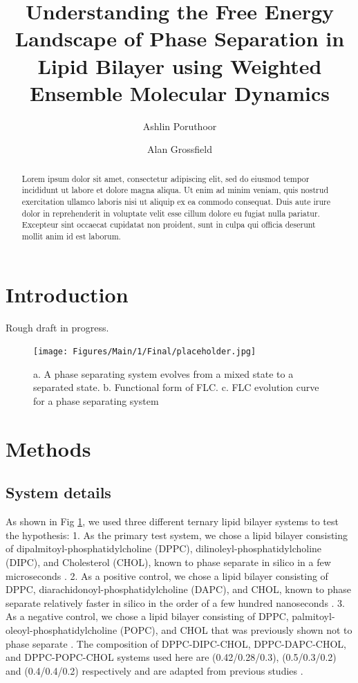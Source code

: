 \documentclass{biophys-new}
\title{Understanding the Free Energy Landscape of Phase Separation in Lipid Bilayer using Weighted Ensemble Molecular Dynamics}
\author[1]{Ashlin Poruthoor}
\author[1,*]{Alan Grossfield}
\affil[1]{University of Rochester Medical Center, Rochester, NY 14620}
\begin{document}
\begin{frontmatter}
\begin{abstract}

Lorem ipsum dolor sit amet, consectetur adipiscing elit, sed do eiusmod tempor incididunt ut labore et dolore magna aliqua. Ut enim ad minim veniam, quis nostrud exercitation ullamco laboris nisi ut aliquip ex ea commodo consequat. Duis aute irure dolor in reprehenderit in voluptate velit esse cillum dolore eu fugiat nulla pariatur. Excepteur sint occaecat cupidatat non proident, sunt in culpa qui officia deserunt mollit anim id est laborum.

\end{abstract}

\end{frontmatter}

\section*{Introduction}

Rough draft in progress.

\begin{figure}[hbt!]
\centering
\texttt{[image: Figures/Main/1/Final/placeholder.jpg]}
\caption{a. A phase separating system evolves from a mixed state to a separated state. b. Functional form of FLC. c. FLC evolution curve for a phase separating system}
\label{fig1:view}
\end{figure}

\section*{Methods}

\subsection*{System details}

As shown in Fig \ref{fig1:view}, we used three different ternary lipid bilayer systems to test the hypothesis:
1. As the primary test system, we chose a lipid bilayer consisting of dipalmitoyl-phosphatidylcholine (DPPC), dilinoleyl-phosphatidylcholine (DIPC), and Cholesterol (CHOL), known to phase separate in silico in a few microseconds \cite{Risselada2008, Schafer2010, Janosi2012, Doma2012, Jong2013, Liu2020, Su2020}.
2. As a positive control, we chose a lipid bilayer consisting of DPPC, diarachidonoyl-phosphatidylcholine (DAPC), and CHOL, known to phase separate relatively faster in silico in the order of a few hundred nanoseconds \cite{Lin2016, Lin2019, Davis2013a}.
3. As a negative control, we chose a lipid bilayer consisting of DPPC, palmitoyl-oleoyl-phosphatidylcholine (POPC), and CHOL that was previously shown not to phase separate \cite{Veatch2003,Davis2013a}.
The composition of DPPC-DIPC-CHOL, DPPC-DAPC-CHOL, and DPPC-POPC-CHOL systems used here are (0.42/0.28/0.3), (0.5/0.3/0.2) and (0.4/0.4/0.2) respectively and are adapted from previous studies \cite{Risselada2008, Lin2016, Davis2013a}.
\end{document}

